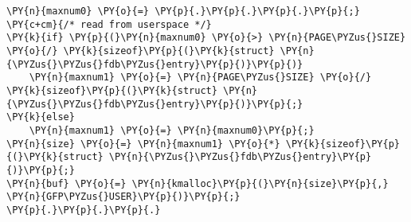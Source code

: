 \begin{Verbatim}[commandchars=\\\{\}]
\PY{n}{maxnum0} \PY{o}{=} \PY{p}{.}\PY{p}{.}\PY{p}{.}\PY{p}{;} \PY{c+cm}{/* read from userspace */} 
\PY{k}{if} \PY{p}{(}\PY{n}{maxnum0} \PY{o}{>} \PY{n}{PAGE\PYZus{}SIZE} \PY{o}{/} \PY{k}{sizeof}\PY{p}{(}\PY{k}{struct} \PY{n}{\PYZus{}\PYZus{}fdb\PYZus{}entry}\PY{p}{)}\PY{p}{)}
    \PY{n}{maxnum1} \PY{o}{=} \PY{n}{PAGE\PYZus{}SIZE} \PY{o}{/} \PY{k}{sizeof}\PY{p}{(}\PY{k}{struct} \PY{n}{\PYZus{}\PYZus{}fdb\PYZus{}entry}\PY{p}{)}\PY{p}{;}
\PY{k}{else}
    \PY{n}{maxnum1} \PY{o}{=} \PY{n}{maxnum0}\PY{p}{;}
\PY{n}{size} \PY{o}{=} \PY{n}{maxnum1} \PY{o}{*} \PY{k}{sizeof}\PY{p}{(}\PY{k}{struct} \PY{n}{\PYZus{}\PYZus{}fdb\PYZus{}entry}\PY{p}{)}\PY{p}{;}
\PY{n}{buf} \PY{o}{=} \PY{n}{kmalloc}\PY{p}{(}\PY{n}{size}\PY{p}{,} \PY{n}{GFP\PYZus{}USER}\PY{p}{)}\PY{p}{;}
\PY{p}{.}\PY{p}{.}\PY{p}{.}
\end{Verbatim}
